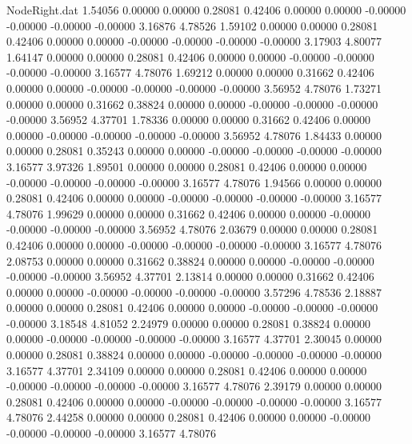 \begin{filecontents}{NodeRight.dat}
   1.54056    0.00000    0.00000     0.28081    0.42406    0.00000    0.00000   -0.00000   -0.00000   -0.00000   -0.00000    3.16876    4.78526
   1.59102    0.00000    0.00000     0.28081    0.42406    0.00000    0.00000   -0.00000   -0.00000   -0.00000   -0.00000    3.17903    4.80077
   1.64147    0.00000    0.00000     0.28081    0.42406    0.00000    0.00000   -0.00000   -0.00000   -0.00000   -0.00000    3.16577    4.78076
   1.69212    0.00000    0.00000     0.31662    0.42406    0.00000    0.00000   -0.00000   -0.00000   -0.00000   -0.00000    3.56952    4.78076
   1.73271    0.00000    0.00000     0.31662    0.38824    0.00000    0.00000   -0.00000   -0.00000   -0.00000   -0.00000    3.56952    4.37701
   1.78336    0.00000    0.00000     0.31662    0.42406    0.00000    0.00000   -0.00000   -0.00000   -0.00000   -0.00000    3.56952    4.78076
   1.84433    0.00000    0.00000     0.28081    0.35243    0.00000    0.00000   -0.00000   -0.00000   -0.00000   -0.00000    3.16577    3.97326
   1.89501    0.00000    0.00000     0.28081    0.42406    0.00000    0.00000   -0.00000   -0.00000   -0.00000   -0.00000    3.16577    4.78076
   1.94566    0.00000    0.00000     0.28081    0.42406    0.00000    0.00000   -0.00000   -0.00000   -0.00000   -0.00000    3.16577    4.78076
   1.99629    0.00000    0.00000     0.31662    0.42406    0.00000    0.00000   -0.00000   -0.00000   -0.00000   -0.00000    3.56952    4.78076
   2.03679    0.00000    0.00000     0.28081    0.42406    0.00000    0.00000   -0.00000   -0.00000   -0.00000   -0.00000    3.16577    4.78076
   2.08753    0.00000    0.00000     0.31662    0.38824    0.00000    0.00000   -0.00000   -0.00000   -0.00000   -0.00000    3.56952    4.37701
   2.13814    0.00000    0.00000     0.31662    0.42406    0.00000    0.00000   -0.00000   -0.00000   -0.00000   -0.00000    3.57296    4.78536
   2.18887    0.00000    0.00000     0.28081    0.42406    0.00000    0.00000   -0.00000   -0.00000   -0.00000   -0.00000    3.18548    4.81052
   2.24979    0.00000    0.00000     0.28081    0.38824    0.00000    0.00000   -0.00000   -0.00000   -0.00000   -0.00000    3.16577    4.37701
   2.30045    0.00000    0.00000     0.28081    0.38824    0.00000    0.00000   -0.00000   -0.00000   -0.00000   -0.00000    3.16577    4.37701
   2.34109    0.00000    0.00000     0.28081    0.42406    0.00000    0.00000   -0.00000   -0.00000   -0.00000   -0.00000    3.16577    4.78076
   2.39179    0.00000    0.00000     0.28081    0.42406    0.00000    0.00000   -0.00000   -0.00000   -0.00000   -0.00000    3.16577    4.78076
   2.44258    0.00000    0.00000     0.28081    0.42406    0.00000    0.00000   -0.00000   -0.00000   -0.00000   -0.00000    3.16577    4.78076

\end{filecontents}
